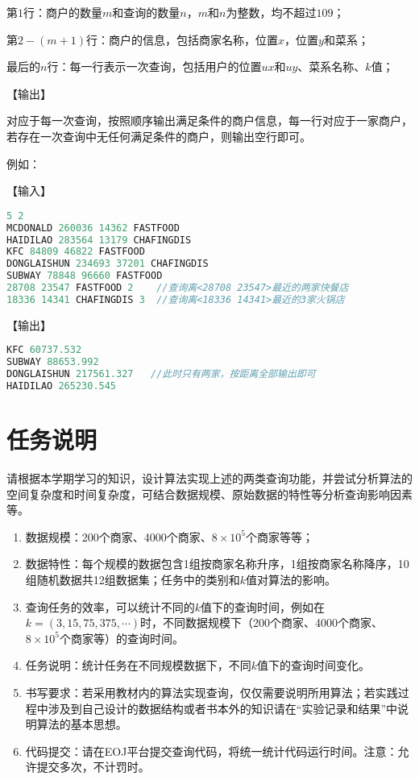 \documentclass{article}
\begin{document}
第$1$行：商户的数量$m$和查询的数量$n$，$m$和$n$为整数，均不超过$109$；

第$2-(m+1)$行：商户的信息，包括商家名称，位置$x$，位置$y$和菜系；

最后的$n$行：每一行表示一次查询，包括用户的位置$ux$和$uy$、菜系名称、$k$值；

{\heiti【输出】}

对应于每一次查询，按照顺序输出满足条件的商户信息，每一行对应于一家商户，若存在一次查询中无任何满足条件的商户，则输出空行即可。

{\heiti 例如：}

{\heiti【输入】}
\begin{lstlisting}[xleftmargin = 4em,xrightmargin = 12em, aboveskip = 0.5em, numbers = none, language = C, frame=single,framesep=1em]
5 2
MCDONALD 260036 14362 FASTFOOD
HAIDILAO 283564 13179 CHAFINGDIS
KFC 84809 46822 FASTFOOD
DONGLAISHUN 234693 37201 CHAFINGDIS
SUBWAY 78848 96660 FASTFOOD
28708 23547 FASTFOOD 2    //查询离<28708 23547>最近的两家快餐店
18336 14341 CHAFINGDIS 3  //查询离<18336 14341>最近的3家火锅店
\end{lstlisting}

{\heiti【输出】}
\begin{lstlisting}[xleftmargin = 4em,xrightmargin = 15em, aboveskip = 0.5em, numbers = none, language = C, frame=single,framesep=1em]
KFC 60737.532
SUBWAY 88653.992
DONGLAISHUN 217561.327   //此时只有两家，按距离全部输出即可
HAIDILAO 265230.545
\end{lstlisting}
\normalsize
\section{任务说明}
\large
请根据本学期学习的知识，设计算法实现上述的两类查询功能，并尝试分析算法的空间复杂度和时间复杂度，可结合数据规模、原始数据的特性等分析查询影响因素等。

\begin{enumerate}[noitemsep, label={{\arabic*})}]
    \item 数据规模：200个商家、4000个商家、$8\times 10^5$个商家等等；
    \item 数据特性：每个规模的数据包含1组按商家名称升序，1组按商家名称降序，10组随机数据共12组数据集；任务中的类别和$k$值对算法的影响。
    \item 查询任务的效率，可以统计不同的$k$值下的查询时间，例如在$k=(3,15,75,375,\cdots)$时，不同数据规模下（200个商家、4000个商家、$8\times 10^5$个商家等）的查询时间。
    \item 任务说明：统计任务在不同规模数据下，不同$k$值下的查询时间变化。
    \item 书写要求：若采用教材内的算法实现查询，仅仅需要说明所用算法；若实践过程中涉及到自己设计的数据结构或者书本外的知识请在“实验记录和结果”中说明算法的基本思想。
    \item 代码提交：请在EOJ平台提交查询代码，将统一统计代码运行时间。注意：允许提交多次，不计罚时。
\end{enumerate}
\end{document}

